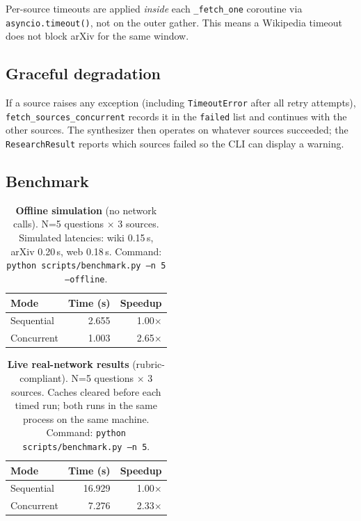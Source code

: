 \documentclass[12pt,a4paper]{article}
\begin{document}
Per-source timeouts are applied \textit{inside} each \texttt{\_fetch\_one} coroutine via
\texttt{asyncio.timeout()}, not on the outer gather. This means a Wikipedia timeout does not
block arXiv for the same window.

\subsection{Graceful degradation}

If a source raises any exception (including \texttt{TimeoutError} after all retry attempts),
\texttt{fetch\_sources\_concurrent} records it in the \texttt{failed} list and continues with
the other sources. The synthesizer then operates on whatever sources succeeded; the \texttt{ResearchResult}
reports which sources failed so the CLI can display a warning.

\subsection{Benchmark}

\begin{table}[h]
\centering
\begin{tabular}{lrr}
\toprule
Mode & Time (s) & Speedup \\
\midrule
Sequential & 2.655 & 1.00$\times$ \\
Concurrent & 1.003 & 2.65$\times$ \\
\bottomrule
\end{tabular}
\caption{\textbf{Offline simulation} (no network calls). N=5 questions $\times$ 3 sources.
Simulated latencies: wiki 0.15\,s, arXiv 0.20\,s, web 0.18\,s.
Command: \texttt{python scripts/benchmark.py --n 5 --offline}.}
\end{table}

\begin{table}[h]
\centering
\begin{tabular}{lrr}
\toprule
Mode & Time (s) & Speedup \\
\midrule
Sequential & 16.929 & 1.00$\times$ \\
Concurrent &  7.276 & 2.33$\times$ \\
\bottomrule
\end{tabular}
\caption{\textbf{Live real-network results} (rubric-compliant). N=5 questions $\times$ 3 sources.
Caches cleared before each timed run; both runs in the same process on the same machine.
Command: \texttt{python scripts/benchmark.py --n 5}.}
\end{table}
\end{document}
